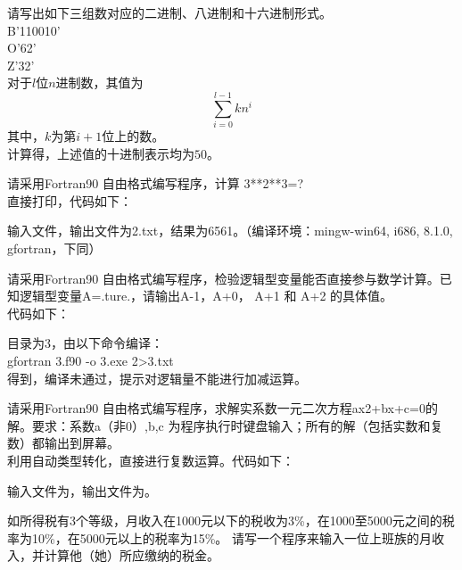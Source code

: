 \documentclass{ctexart}
\begin{document}
    \maketitle
    
    \begin{answer}

            请写出如下三组数对应的二进制、八进制和十六进制形式。\\
            B'110010'\\
            O'62'\\
            Z'32'\\

            对于$l$位$n$进制数，其值为
            \[\sum_{i=0}^{l-1} kn^i\]
            其中，$k$为第$i+1$位上的数。\\
            计算得，上述值的十进制表示均为$50$。

            请采用Fortran90 自由格式编写程序，计算 3**2**3=?\\

            直接打印，代码如下：

            输入文件，输出文件为2.txt，结果为6561。（编译环境：mingw-win64, i686, 8.1.0, gfortran，下同）

            请采用Fortran90 自由格式编写程序，检验逻辑型变量能否直接参与数学计算。已知逻辑型变量A=.ture.，请输出A-1，A+0， A+1 和 A+2 的具体值。\\

            代码如下：

            目录为3，由以下命令编译：\\gfortran 3.f90 -o 3.exe 2>3.txt\\
            得到，编译未通过，提示对逻辑量不能进行加减运算。

            请采用Fortran90 自由格式编写程序，求解实系数一元二次方程ax2+bx+c=0的解。要求：系数a（非0）,b,c 为程序执行时键盘输入；所有的解（包括实数和复数）都输出到屏幕。\\

            利用自动类型转化，直接进行复数运算。代码如下：

            输入文件为，输出文件为。

            如所得税有3个等级，月收入在1000元以下的税收为3\%，在1000至5000元之间的税率为10\%，在5000元以上的税率为15\%。
            请写一个程序来输入一位上班族的月收入，并计算他（她）所应缴纳的税金。\\


\end{answer}
\end{document}

